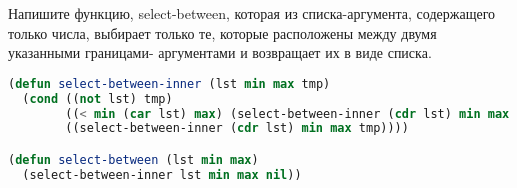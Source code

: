 Напишите функцию, select-between, которая из списка-аргумента, содержащего только
числа, выбирает только те, которые расположены между двумя указанными границами-
аргументами и возвращает их в виде списка.

\begin{lstlisting}[language=Lisp]
(defun select-between-inner (lst min max tmp)
  (cond ((not lst) tmp)
        ((< min (car lst) max) (select-between-inner (cdr lst) min max (cons (car lst) tmp)))
        ((select-between-inner (cdr lst) min max tmp))))

(defun select-between (lst min max)
  (select-between-inner lst min max nil))
\end{lstlisting}

